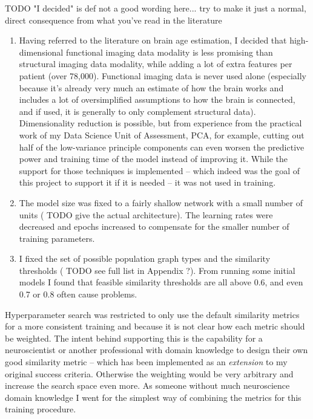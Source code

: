 TODO "I decided" is def not a good wording here... try to make it just a normal, direct consequence from what you've read in the literature
\begin{enumerate}
    \item Having referred to the literature on brain age estimation, I decided that high-dimensional functional imaging data modality is less promising than structural imaging data modality, while adding a lot of extra features per patient (over 78,000). Functional imaging data is never used alone (especially because it's already very much an estimate of how the brain works and includes a lot of oversimplified assumptions to how the brain is connected, and if used, it is generally to only complement structural data). Dimensionality reduction is possible, but from experience from the practical work of my Data Science Unit of Assessment, PCA, for example, cutting out half of the low-variance principle components can even worsen the predictive power and training time of the model instead of improving it. While the support for those techniques is implemented – which indeed was the goal of this project to support it if it is needed – it was not used in training.
    \item The model size was fixed to a fairly shallow network with a small number of units (
        TODO give the actual architecture). 
        The learning rates were decreased and epochs increased to compensate for the smaller number of training parameters.
    \item I fixed the set of possible population graph types and the similarity thresholds (
    TODO see full list in Appendix ?). 
    From running some initial models I found that feasible similarity thresholds are all above 0.6, and even 0.7 or 0.8 often cause problems. 
\end{enumerate}


Hyperparameter search was restricted to only use the default similarity metrics for a more consistent training and because it is not clear how each metric should be weighted. The intent behind supporting this is the capability for a neuroscientist or another professional with domain knowledge to design their own good similarity metric – which has been implemented as an \textit{extension} to my original success criteria. Otherwise the weighting would be very arbitrary and increase the search space even more. As someone without much neuroscience domain knowledge I went for the simplest way of combining the metrics for this training procedure.

